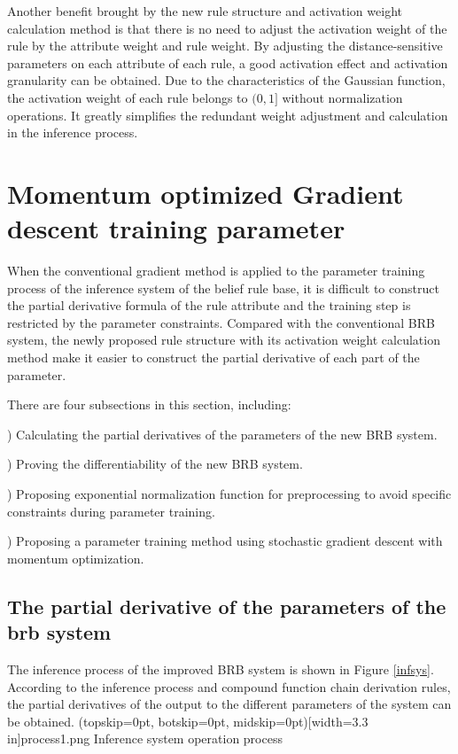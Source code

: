 \documentclass{ieeeaccess}
\begin{document}
Another benefit brought by the new rule structure and activation weight calculation method is that
there is no need to adjust the activation weight of the rule by the attribute weight and rule weight.
By adjusting the distance-sensitive parameters on each attribute of each rule, a good activation effect and activation granularity can be obtained.
Due to the characteristics of the Gaussian function, the activation weight of each rule belongs to $(0, 1]$ without normalization operations.
It greatly simplifies the redundant weight adjustment and calculation in the inference process.


\section{Momentum optimized Gradient descent training parameter}
When the conventional gradient method is applied to the parameter training process of the inference system of the belief rule base,
it is difficult to construct the partial derivative formula of the rule attribute and the training step is restricted by the parameter constraints.
Compared with the conventional BRB system, the newly proposed rule structure with its activation weight calculation method make it easier to construct the partial derivative of each part of the parameter.

There are four subsections in this section, including:

) Calculating the partial derivatives of the parameters of the new BRB system.

) Proving the differentiability of the new BRB system.

) Proposing exponential normalization function for preprocessing to avoid specific constraints during parameter training.

) Proposing a parameter training method using stochastic gradient descent with momentum optimization.


\subsection{The partial derivative of the parameters of the brb system}
The inference process of the improved BRB system is shown in Figure \ref{infsys}.
According to the inference process and compound function chain derivation rules, the partial derivatives of the output to the different parameters of the system can be obtained.
\Figure[!t](topskip=0pt, botskip=0pt, midskip=0pt)[width=3.3 in]{process1.png}
{Inference system operation process\label{infsys}}
\end{document}
